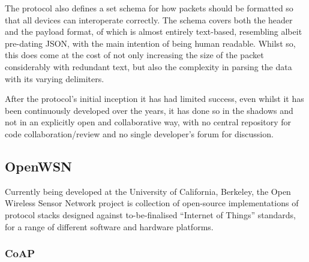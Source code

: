 The protocol also defines a set schema for how packets should be formatted so that all devices can interoperate correctly. The schema covers both the header and the payload format, of which is almost entirely text-based, resembling albeit pre-dating JSON, with the main intention of being human readable. Whilst so, this does come at the cost of not only increasing the size of the packet considerably with redundant text, but also the complexity in parsing the data with its varying delimiters. 

After the protocol's initial inception it has had limited success, even whilst it has been continuously developed over the years, it has done so in the shadows and not in an explicitly open and collaborative way, with no central repository for code collaboration/review and no single developer's forum for discussion. %

\subsection{OpenWSN} %
\label{sub:owsn_berkeley}
Currently being developed at the University of California, Berkeley, the Open Wireless Sensor Network project is collection of open-source implementations of protocol stacks designed against to-be-finalised ``Internet of Things'' standards, for a range of different software and hardware platforms.



\subsubsection{CoAP} %
\label{ssub:coap}

